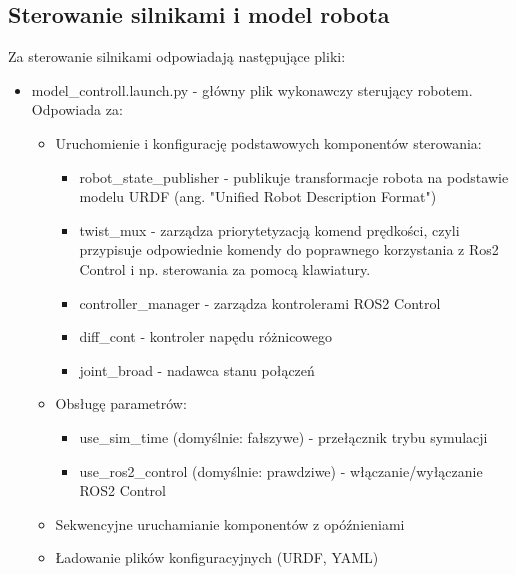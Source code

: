 \documentclass[a4paper,twoside,12pt]{book}
\begin{document}
\subsection{Sterowanie silnikami i model robota}
Za sterowanie silnikami odpowiadają następujące pliki:
\begin{itemize}

	\item model\_controll.launch.py - główny plik wykonawczy sterujący robotem. Odpowiada za:
		\begin{itemize}
			\item Uruchomienie i konfigurację podstawowych komponentów sterowania:
			\begin{itemize}
				\item robot\_state\_publisher - publikuje transformacje robota na podstawie modelu URDF (ang. "Unified Robot Description Format")
				\item twist\_mux - zarządza priorytetyzacją komend prędkości, czyli przypisuje odpowiednie komendy do poprawnego korzystania z Ros2 Control i np. sterowania za pomocą klawiatury.
				\item controller\_manager - zarządza kontrolerami ROS2 Control
				\item diff\_cont - kontroler napędu różnicowego
				\item joint\_broad - nadawca stanu połączeń
			\end{itemize}
			\newpage
			\item Obsługę parametrów:
			\begin{itemize}
				\item use\_sim\_time (domyślnie: fałszywe) - przełącznik trybu symulacji
				\item use\_ros2\_control (domyślnie: prawdziwe) - włączanie/wyłączanie ROS2 Control
			\end{itemize}
			\item Sekwencyjne uruchamianie komponentów z opóźnieniami
			\item Ładowanie plików konfiguracyjnych (URDF, YAML)
		\end{itemize}


\end{itemize}
\end{document}
